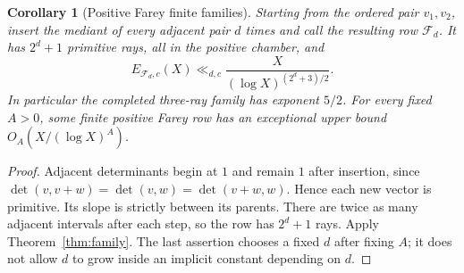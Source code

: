 \documentclass[11pt]{article}
\newtheorem{corollary}[theorem]{Corollary}
\theoremstyle{remark}\newtheorem{remark}[theorem]{Remark}
\begin{document}
\begin{corollary}[Positive Farey finite families]\label{cor:fareybound}
Starting from the ordered pair $v_1,v_2$, insert the mediant of every adjacent pair $d$ times and call the resulting row $\mathcal F_d$. It has $2^d+1$ primitive rays, all in the positive chamber, and
\[
 E_{\mathcal F_d,c}(X)\ll_{d,c}
 \frac{X}{(\log X)^{(2^d+3)/2}}.
\]
In particular the completed three-ray family has exponent $5/2$. For every fixed $A>0$, some finite positive Farey row has an exceptional upper bound $O_A(X/(\log X)^A)$.
\end{corollary}
\begin{proof}
Adjacent determinants begin at $1$ and remain $1$ after insertion, since $\det(v,v+w)=\det(v,w)=\det(v+w,w)$. Hence each new vector is primitive. Its slope is strictly between its parents. There are twice as many adjacent intervals after each step, so the row has $2^d+1$ rays. Apply Theorem~\ref{thm:family}. The last assertion chooses a fixed $d$ after fixing $A$; it does not allow $d$ to grow inside an implicit constant depending on $d$.
\end{proof}
\end{document}
